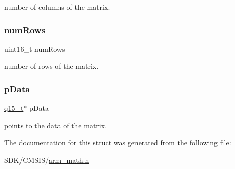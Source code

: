 number of columns of the matrix. \mbox{\label{structarm__matrix__instance__q15_a1bcf80ccdc2acc29198f1592ae300390}} 
\subsubsection{\texorpdfstring{num\+Rows}{numRows}}
{\footnotesize\ttfamily uint16\+\_\+t num\+Rows}

number of rows of the matrix. \mbox{\label{structarm__matrix__instance__q15_a817ede38365e63e561a12069c6c5c087}} 
\subsubsection{\texorpdfstring{p\+Data}{pData}}
{\footnotesize\ttfamily \mbox{\hyperlink{arm__math_8h_ab5a8fb21a5b3b983d5f54f31614052ea}{q15\+\_\+t}}$\ast$ p\+Data}

points to the data of the matrix. 

The documentation for this struct was generated from the following file\+:\begin{DoxyCompactItemize}
\item 
S\+D\+K/\+C\+M\+S\+I\+S/\mbox{\hyperlink{arm__math_8h}{arm\+\_\+math.\+h}}\end{DoxyCompactItemize}
